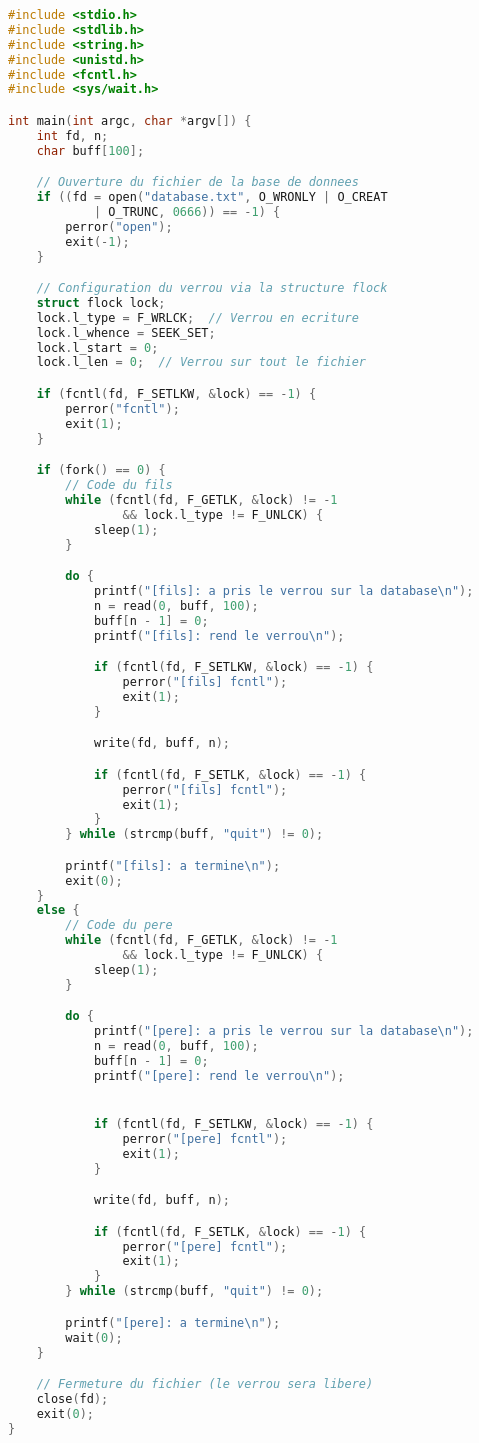 \begin{mdframed}[style=mystyle]
\begin{lstlisting}[language=C, caption={Code C avec verrouillage de fichier}]
#include <stdio.h>
#include <stdlib.h>
#include <string.h>
#include <unistd.h>
#include <fcntl.h>
#include <sys/wait.h>

int main(int argc, char *argv[]) {
    int fd, n;
    char buff[100];

    // Ouverture du fichier de la base de donnees
    if ((fd = open("database.txt", O_WRONLY | O_CREAT 
            | O_TRUNC, 0666)) == -1) {
        perror("open");
        exit(-1);
    }

    // Configuration du verrou via la structure flock
    struct flock lock;
    lock.l_type = F_WRLCK;  // Verrou en ecriture
    lock.l_whence = SEEK_SET;
    lock.l_start = 0;
    lock.l_len = 0;  // Verrou sur tout le fichier

    if (fcntl(fd, F_SETLKW, &lock) == -1) {
        perror("fcntl");
        exit(1);
    }

    if (fork() == 0) {
        // Code du fils
        while (fcntl(fd, F_GETLK, &lock) != -1 
                && lock.l_type != F_UNLCK) {
            sleep(1);
        }

        do {
            printf("[fils]: a pris le verrou sur la database\n");
            n = read(0, buff, 100);
            buff[n - 1] = 0;
            printf("[fils]: rend le verrou\n");

            if (fcntl(fd, F_SETLKW, &lock) == -1) {
                perror("[fils] fcntl");
                exit(1);
            }

            write(fd, buff, n);

            if (fcntl(fd, F_SETLK, &lock) == -1) {
                perror("[fils] fcntl");
                exit(1);
            }
        } while (strcmp(buff, "quit") != 0);

        printf("[fils]: a termine\n");
        exit(0);
    }
    else {
        // Code du pere
        while (fcntl(fd, F_GETLK, &lock) != -1 
                && lock.l_type != F_UNLCK) {
            sleep(1);
        }

        do {
            printf("[pere]: a pris le verrou sur la database\n");
            n = read(0, buff, 100);
            buff[n - 1] = 0;
            printf("[pere]: rend le verrou\n");


            if (fcntl(fd, F_SETLKW, &lock) == -1) {
                perror("[pere] fcntl");
                exit(1);
            }

            write(fd, buff, n);

            if (fcntl(fd, F_SETLK, &lock) == -1) {
                perror("[pere] fcntl");
                exit(1);
            }
        } while (strcmp(buff, "quit") != 0);

        printf("[pere]: a termine\n");
        wait(0);
    }

    // Fermeture du fichier (le verrou sera libere)
    close(fd);
    exit(0);
}
\end{lstlisting}
\end{mdframed}
